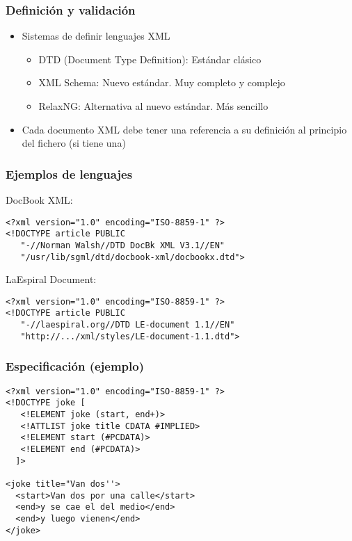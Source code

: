 \begin{frame}
\frametitle{Definición y validación}

\begin{itemize}
\item Sistemas de definir lenguajes XML
  \begin{itemize}
  \item DTD (Document Type Definition): Estándar clásico
  \item XML Schema: Nuevo estándar. Muy completo y complejo
  \item RelaxNG: Alternativa al nuevo estándar. Más sencillo
  \end{itemize}
\item Cada documento XML debe tener una referencia a su definición al principio del fichero (si tiene una)
\end{itemize}

\end{frame}


\begin{frame}[fragile]
\frametitle{Ejemplos de lenguajes}

DocBook XML:

\begin{verbatim}
<?xml version="1.0" encoding="ISO-8859-1" ?>
<!DOCTYPE article PUBLIC 
   "-//Norman Walsh//DTD DocBk XML V3.1//EN"
   "/usr/lib/sgml/dtd/docbook-xml/docbookx.dtd">
\end{verbatim}

LaEspiral Document:

\begin{verbatim}
<?xml version="1.0" encoding="ISO-8859-1" ?>
<!DOCTYPE article PUBLIC 
   "-//laespiral.org//DTD LE-document 1.1//EN"
   "http://.../xml/styles/LE-document-1.1.dtd">
\end{verbatim}

\end{frame}


\begin{frame}[fragile]
\frametitle{Especificación (ejemplo)}

\begin{verbatim}
<?xml version="1.0" encoding="ISO-8859-1" ?>
<!DOCTYPE joke [
   <!ELEMENT joke (start, end+)>
   <!ATTLIST joke title CDATA #IMPLIED>
   <!ELEMENT start (#PCDATA)>
   <!ELEMENT end (#PCDATA)>
  ]>

<joke title="Van dos''>
  <start>Van dos por una calle</start>
  <end>y se cae el del medio</end>
  <end>y luego vienen</end>
</joke>
\end{verbatim}

\end{frame}

